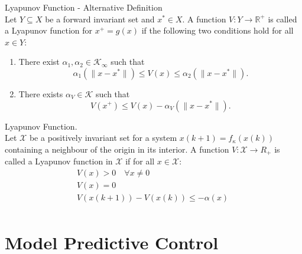 \begin{definition}{Lyapunov Function - Alternative Definition}\\
	Let $Y \subseteq X$ be a forward invariant set and $x^* \in X$. A function $V : Y \rightarrow \mathbb{R}^+$ is called a Lyapunov function for $x^+ = g(x)$ if the following two conditions hold for all $x \in Y$:
	
	\begin{enumerate}
		\item There exist $\alpha_1, \alpha_2 \in \mathcal{K}_\infty$ such that
		\[
		\alpha_1(\|x - x^*\|) \leq V(x) \leq \alpha_2(\|x - x^*\|).
		\]
		
		\item There exists $\alpha_V \in \mathcal{K}$ such that
		\[
		V(x^+) \leq V(x) - \alpha_V(\|x - x^*\|).
		\]
	\end{enumerate}
\end{definition}



\begin{definition}{Lyapunov Function}. \\
	Let $\mathcal{X}$ be a positively invariant set for a system $x(k+1) = f_\kappa (x(k))$ containing a neighbour of the origin in its interior. A function $V : \mathcal{X} \rightarrow R_+$ is called a Lyapunov function in $\mathcal{X}$ if for all $x \in \mathcal{X}$:
	\begin{align*}
		&V(x) > 0 \quad \forall x \neq 0\\
		&V(x) = 0 \quad\\
		&V(x(k+1)) - V(x(k)) \leq -\alpha(x) \quad\\
	\end{align*}
	
	
\end{definition}




\section{Model Predictive Control}\label{sec:mpc_theory}

